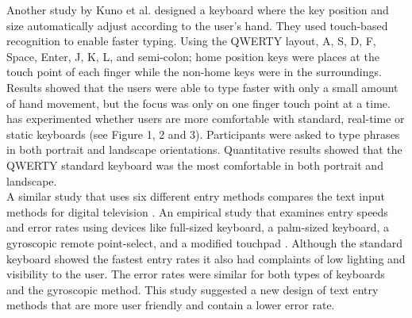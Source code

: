 \documentclass{vgtc}                          %
\begin{document}
Another study by Kuno et al.  \cite{kuno:2013} designed a keyboard where the key position and size automatically adjust according to the user’s hand. They used touch-based recognition to enable faster typing. Using the QWERTY layout, A, S, D, F, Space, Enter, J, K, L, and semi-colon; home position keys were places at the touch point of each finger while the non-home keys were in the surroundings. Results showed that the users were able to type faster with only a small amount of hand movement, but the focus was only on one finger touch point at a time.\cite{13} has experimented whether users are more comfortable with standard, real-time or static keyboards (see Figure 1, 2 and 3). Participants were asked to type phrases in both portrait and landscape orientations. Quantitative results showed that the QWERTY standard keyboard was the most comfortable in both portrait and landscape\cite{13}.\\[1em] 
A similar study that uses six different entry methods compares the text input methods for digital television \cite{28}. An empirical study that examines entry speeds and error rates using  devices like full-sized keyboard, a palm-sized keyboard, a gyroscopic remote point-select, and a modified touchpad \cite{28}. Although the standard keyboard showed the fastest entry rates it also had complaints of low lighting and visibility to the user. The error rates were similar for both types of keyboards and the gyroscopic method. This study suggested a new design of text entry methods that are more user friendly and contain a lower error rate. 
\end{document}
